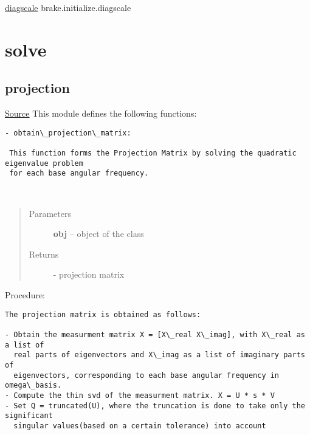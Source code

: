\documentclass[letterpaper,10pt,english]{sphinxmanual}
\begin{document}


{\hyperref[index:diagscale]{diagscale}}  brake.initialize.diagscale




\chapter{solve}
\label{index:solve}

\section{projection}
\label{index:projection}
\href{https://bitbucket.org/akadar/brakesqueal0.1/src/10fdbd0824e88ebbee4f44cefa781c01e586db41/brake/solve/projection.py?at=master}{Source}
\label{index:module-brake.solve.projection}
This module defines the following functions:

\begin{Verbatim}[commandchars=\\\{\}]
- obtain\_projection\_matrix:

 This function forms the Projection Matrix by solving the quadratic eigenvalue problem 
 for each base angular frequency.
\end{Verbatim}

\begin{fulllineitems}
\label{index:brake.solve.projection.obtain_projection_matrix}~\begin{quote}\begin{description}
\item[{Parameters}] \leavevmode
\textbf{obj} -- object of the class 

\item[{Returns}] \leavevmode
{} - projection matrix

\end{description}\end{quote}

Procedure:

\begin{Verbatim}[commandchars=\\\{\}]
The projection matrix is obtained as follows:

- Obtain the measurment matrix X = [X\_real X\_imag], with X\_real as a list of 
  real parts of eigenvectors and X\_imag as a list of imaginary parts of 
  eigenvectors, corresponding to each base angular frequency in omega\_basis.
- Compute the thin svd of the measurment matrix. X = U * s * V
- Set Q = truncated(U), where the truncation is done to take only the significant 
  singular values(based on a certain tolerance) into account
\end{Verbatim}

\end{fulllineitems}
\end{document}
